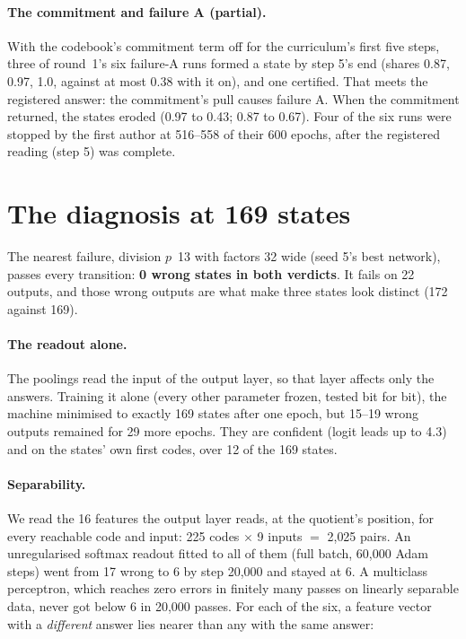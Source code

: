 \documentclass[11pt]{article}
\begin{document}
\paragraph{The commitment and failure A (partial).} With the codebook's commitment term off for
the curriculum's first five steps, three of round~1's six failure-A runs formed a state by step 5's
end (shares 0.87, 0.97, 1.0, against at most 0.38 with it on), and one certified. That meets the
registered answer: the commitment's pull causes failure A. When the commitment returned, the
states eroded (0.97 to 0.43; 0.87 to 0.67). Four of the six runs were stopped by the first author
at 516--558 of their 600 epochs, after the registered reading (step 5) was complete.

\section{The diagnosis at 169 states}
\label{sec:diagnosis}

The nearest failure, division $p$~13 with factors 32 wide (seed 5's best network), passes every
transition: \textbf{0 wrong states in both verdicts}. It fails on 22 outputs, and those wrong
outputs are what make three states look distinct (172 against 169).

\paragraph{The readout alone.} The poolings read the input of the output layer, so that layer
affects only the answers. Training it alone (every other parameter frozen, tested bit for bit),
the machine minimised to exactly 169 states after one epoch, but 15--19 wrong outputs remained for
29 more epochs. They are confident (logit leads up to 4.3) and on the states' own first codes, over
12 of the 169 states.

\paragraph{Separability.} We read the 16 features the output layer reads, at the quotient's
position, for every reachable code and input: 225 codes $\times$ 9 inputs $=$ 2{,}025 pairs. An
unregularised softmax readout fitted to all of them (full batch, 60{,}000 Adam steps) went from 17
wrong to 6 by step 20{,}000 and stayed at 6. A multiclass perceptron, which reaches zero errors in
finitely many passes on linearly separable data, never got below 6 in 20{,}000 passes. For each of
the six, a feature vector with a \emph{different} answer lies nearer than any with the same answer:
\end{document}
